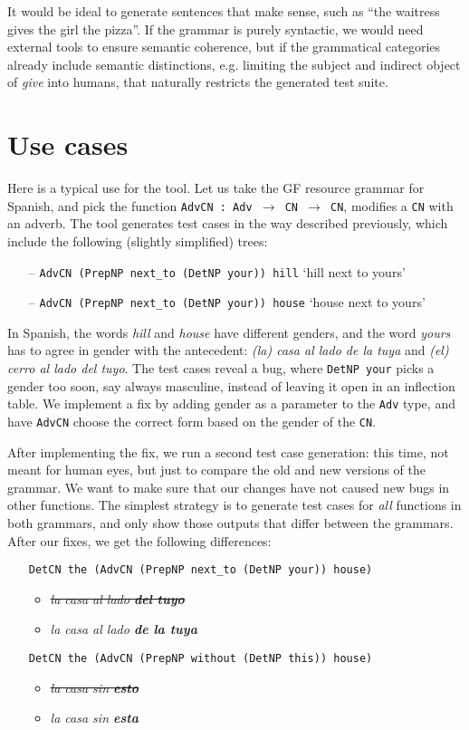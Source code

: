 \documentclass[11pt]{article}
\def\t#1{\texttt{#1}}
\begin{document}
It would be ideal to generate sentences that make sense,
such as ``the waitress gives the girl the pizza''. If the grammar is
purely syntactic, we would need external tools to ensure semantic
coherence, but if the grammatical categories already include semantic
distinctions, e.g. limiting the subject and indirect object of
\emph{give} into humans, that naturally restricts the generated test suite.

\section{Use cases}

Here is a typical use for the tool. 
Let us take the GF resource grammar \cite{ranta2009rgl} for Spanish, and
pick the function \t{AdvCN : Adv $\rightarrow$ CN $\rightarrow$ CN}, modifies a \t{CN} with
an adverb.
The tool generates test cases in the way described previously,
which include the following (slightly simplified) trees: 
\begin{itemize}
\setlength\itemsep{0em}
\item[--] \t{AdvCN (PrepNP next\_to (DetNP your)) hill} `hill next to
yours'
\item[--] \t{AdvCN (PrepNP next\_to (DetNP your)) house} `house next
to yours'
\end{itemize}
In Spanish, the words \emph{hill} and \emph{house} have different
genders, and the word \emph{yours} has to agree in gender 
with the antecedent: \emph{(la) casa al lado de la tuya} and \emph{(el)
  cerro al lado del tuyo}. The test cases reveal a bug, where \t{DetNP your} 
picks a gender too soon, say always masculine, instead of leaving it
open in an inflection table. We implement a fix by adding gender as a
parameter to the \t{Adv} type, and have \t{AdvCN} choose the correct
form based on the gender of the \t{CN}.

After implementing the fix, we run a second test case generation: this
time, not meant for human eyes, but just to compare the old and new
versions of the grammar. We want to make sure that our changes 
have not caused new bugs in other functions. The simplest strategy is
to generate test cases for \emph{all} functions in both grammars, and
only show those outputs that differ between the grammars. After our
fixes, we get the following differences: 

\begin{itemize}
\setlength\itemsep{0em}
\item[] \t{DetCN the (AdvCN (PrepNP next\_to (DetNP your)) house)}
  \begin{itemize}
   \item \emph{\sout{la casa al lado {\bf  del tuyo}}}
   \item \emph{la casa al lado {\bf  de la tuya}}
  \end{itemize}
\item[] \t{DetCN the (AdvCN (PrepNP without (DetNP this)) house)}
  \begin{itemize}
   \item \emph{\sout{la casa sin {\bf  esto}}}
   \item \emph{la casa sin {\bf esta}}
  \end{itemize}
\end{itemize}
\end{document}
